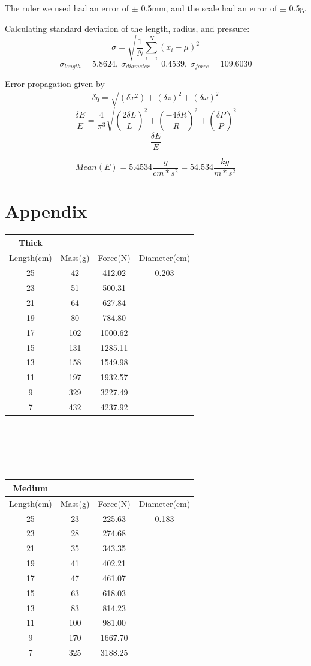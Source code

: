 \documentclass{article}
\begin{document}
The ruler we used had an error of $\pm$ 0.5mm, and the scale had an error of $\pm$ 0.5g.

Calculating standard deviation of the length, radius, and pressure:
$$\sigma = \sqrt{\frac{1}{N}\sum_{i=i}^N{(x_i-\mu )^2}}$$
$$\sigma _{length} = 5.8624,\ \sigma _{diameter} = 0.4539,\ \sigma _{force} = 109.6030$$

Error propagation given by
$$\delta q = \sqrt{(\delta x^2)+(\delta z)^2 + (\delta \omega )^2}$$
$$\frac{\delta E}{E} = \frac{4}{\pi ^3}\sqrt{(\frac{2\delta L}{L})^2 + (\frac{-4\delta R}{R})^2 + (\frac{\delta P}{P})^2}$$
$$\frac{\delta E}{E}$$

$$Mean(E) = 5.4534 \frac{g}{cm*s^2} = 54.534 \frac{kg}{m*s^2}$$

\section{Appendix}
\centering
\begin{tabular}{|| c | c | c | c ||}
 \hline
 Thick &\ &\ &\ \\
 \hline
 Length(cm) & Mass(g) & Force(N) & Diameter(cm) \\
 \hline
 \hline
 25 & 42 & 412.02 & 0.203 \\
 23 & 51 & 500.31 &\ \\
 21 & 64 & 627.84 &\ \\
 19 & 80 & 784.80 &\ \\
 17 & 102 & 1000.62 &\ \\
 15 & 131 & 1285.11 &\ \\
 13 & 158 & 1549.98 &\ \\
 11 & 197 & 1932.57 &\ \\
 9 & 329 & 3227.49 &\ \\
 7 & 432 & 4237.92 &\ \\
 \hline
\end{tabular}\\\ \\\ \\\ 

\centering
\begin{tabular}{|| c | c | c | c ||}
 \hline
 Medium &\ &\ &\ \\
 \hline
 Length(cm) & Mass(g) & Force(N) & Diameter(cm) \\
 \hline
 \hline
 25 & 23 & 225.63 & 0.183\\
 23 & 28 & 274.68 &\ \\
 21 & 35 & 343.35 &\ \\
 19 & 41 & 402.21 &\ \\
 17 & 47 & 461.07 &\ \\
 15 & 63 & 618.03 &\ \\
 13 & 83 & 814.23 &\ \\
 11 & 100 & 981.00 &\ \\
 9 & 170 & 1667.70 &\ \\
 7 & 325 & 3188.25 &\ \\
 \hline
\end{tabular}\\\ \\\ \\\ 
\end{document}

